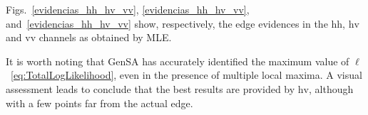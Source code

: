 \documentclass[journal]{IEEEtran}
\providecommand{\DIFadd}[1]{{\protect\color{blue}\uwave{#1}}} %
\providecommand{\DIFdel}[1]{{\protect\color{red}\sout{#1}}}                      %
\providecommand{\DIFaddbegin}{} %
\providecommand{\DIFaddend}{} %
\providecommand{\DIFdelbegin}{} %
\providecommand{\DIFdelend}{} %
\newcommand{\DIFscaledelfig}{0.5}
\newlength{\DIFdelgraphicswidth} %
\newlength{\DIFdelgraphicsheight} %
\newcommand{\DIFaddincludegraphics}[2][]{{\color{blue}\fbox{\DIFOincludegraphics[#1]{#2}}}} %
\newcommand{\DIFdelincludegraphics}[2][]{%
\sbox{\DIFdelgraphicsbox}{\DIFOincludegraphics[#1]{#2}}%
\settoboxwidth{\DIFdelgraphicswidth}{\DIFdelgraphicsbox} %
\settoboxtotalheight{\DIFdelgraphicsheight}{\DIFdelgraphicsbox} %
\scalebox{\DIFscaledelfig}{%
\parbox[b]{\DIFdelgraphicswidth}{\usebox{\DIFdelgraphicsbox}\\[-\baselineskip] \rule{\DIFdelgraphicswidth}{0em}}\llap{\resizebox{\DIFdelgraphicswidth}{\DIFdelgraphicsheight}{%
\setlength{\unitlength}{\DIFdelgraphicswidth}%
\begin{picture}(1,1)%
\thicklines\linethickness{2pt} %
{\color[rgb]{1,0,0}\put(0,0){\framebox(1,1){}}}%
{\color[rgb]{1,0,0}\put(0,0){\line( 1,1){1}}}%
{\color[rgb]{1,0,0}\put(0,1){\line(1,-1){1}}}%
\end{picture}%
}\hspace*{3pt}}} %
} %
\DeclareRobustCommand{\DIFaddbegin}{\DIFOaddbegin \let\includegraphics\DIFaddincludegraphics} %
\DeclareRobustCommand{\DIFaddend}{\DIFOaddend \let\includegraphics\DIFOincludegraphics} %
\DeclareRobustCommand{\DIFdelbegin}{\DIFOdelbegin \let\includegraphics\DIFdelincludegraphics} %
\DeclareRobustCommand{\DIFdelend}{\DIFOaddend \let\includegraphics\DIFOincludegraphics} %
\begin{document}
\DIFdelbegin %

\DIFdelend Figs.~\ref{evidencias_hh_hv_vv}, \ref{evidencias_hh_hv_vv}, and~\ref{evidencias_hh_hv_vv} show, respectively, the edge evidences in the $\text{hh}$, $\text{hv}$ and $\text{vv}$ channels as obtained by MLE.

It is worth noting that GenSA has accurately identified the maximum value of \DIFdelbegin \DIFdel{$\ell$}\DIFdelend \DIFaddbegin \DIFadd{$\mathcal L$ (Eq.}\DIFaddend ~\eqref{eq:TotalLogLikelihood}\DIFaddbegin \DIFadd{)}\DIFaddend , even in the presence of multiple local maxima. 
A visual assessment leads to conclude that the best results are provided by $\text{hv}$, although with a few points far from the actual edge.
\end{document}
